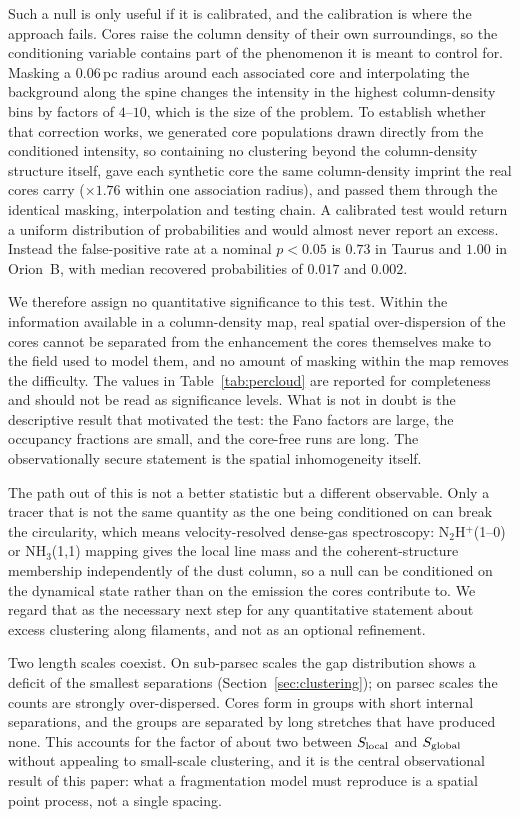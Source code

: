 \documentclass[usenatbib,twoside,twocolumn]{mnras}
\begin{document}
Such a null is only useful if it is calibrated, and the calibration is where the approach fails. Cores raise the column density of their own surroundings, so the conditioning variable contains part of the phenomenon it is meant to control for. Masking a $0.06$\,pc radius around each associated core and interpolating the background along the spine changes the intensity in the highest column-density bins by factors of $4$--$10$, which is the size of the problem. To establish whether that correction works, we generated core populations drawn directly from the conditioned intensity, so containing no clustering beyond the column-density structure itself, gave each synthetic core the same column-density imprint the real cores carry ($\times1.76$ within one association radius), and passed them through the identical masking, interpolation and testing chain. A calibrated test would return a uniform distribution of probabilities and would almost never report an excess. Instead the false-positive rate at a nominal $p<0.05$ is $0.73$ in Taurus and $1.00$ in Orion~B, with median recovered probabilities of $0.017$ and $0.002$.

We therefore assign no quantitative significance to this test. Within the information available in a column-density map, real spatial over-dispersion of the cores cannot be separated from the enhancement the cores themselves make to the field used to model them, and no amount of masking within the map removes the difficulty. The values in Table~\ref{tab:percloud} are reported for completeness and should not be read as significance levels. What is not in doubt is the descriptive result that motivated the test: the Fano factors are large, the occupancy fractions are small, and the core-free runs are long. The observationally secure statement is the spatial inhomogeneity itself.

The path out of this is not a better statistic but a different observable. Only a tracer that is not the same quantity as the one being conditioned on can break the circularity, which means velocity-resolved dense-gas spectroscopy: N$_2$H$^+$(1--0) or NH$_3$(1,1) mapping gives the local line mass and the coherent-structure membership independently of the dust column, so a null can be conditioned on the dynamical state rather than on the emission the cores contribute to. We regard that as the necessary next step for any quantitative statement about excess clustering along filaments, and not as an optional refinement.

Two length scales coexist. On sub-parsec scales the gap distribution shows a deficit of the smallest separations (Section~\ref{sec:clustering}); on parsec scales the counts are strongly over-dispersed. Cores form in groups with short internal separations, and the groups are separated by long stretches that have produced none. This accounts for the factor of about two between $S_{\rm local}$ and $S_{\rm global}$ without appealing to small-scale clustering, and it is the central observational result of this paper: what a fragmentation model must reproduce is a spatial point process, not a single spacing.
\end{document}
